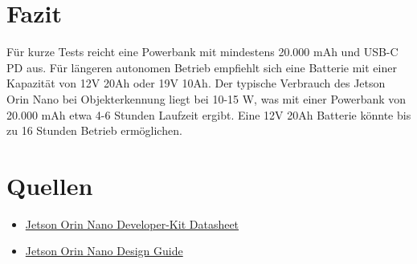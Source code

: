 \documentclass[12pt]{article}
\begin{document}
\section{Fazit}
Für kurze Tests reicht eine Powerbank mit mindestens 20.000 mAh und USB-C PD aus. Für längeren autonomen Betrieb empfiehlt sich eine Batterie mit einer Kapazität von 12V 20Ah oder 19V 10Ah. Der typische Verbrauch des Jetson Orin Nano bei Objekterkennung liegt bei 10-15 W, was mit einer Powerbank von 20.000 mAh etwa 4-6 Stunden Laufzeit ergibt. Eine 12V 20Ah Batterie könnte bis zu 16 Stunden Betrieb ermöglichen.

\section{Quellen}
\begin{itemize}
    \item \textcolor{blue}{\href{https://developer.download.nvidia.com/assets/embedded/secure/jetson/orin_nano/docs/Jetson-Orin-Nano-DevKit-Carrier-Board-Specification_SP-11324-001_v1.2.pdf?KmgI9RJCufnwzXmxbGPExVQp1r131wrAPSzR9RMDhh83EhjqXKmYVbjwEjUNXPMiO3peL2R_7D_xp9mFQTBkPF-Bon3l72rEZPIiNTVUv5oIjQsvFsQ0pqAZxr16W-12GNU3N596RY1rC1tgxd5_XwyvJRNhcRcOank-v-QwQweH0clhI5Vvdy5dZVF-qYLeuslCScepJxD-v-TAHS2XuNFpJb69-WoTOPi_AyxiG2scwgKnqQ==&t=eyJscyI6IndlYnNpdGUiLCJsc2QiOiJkZXZlbG9wZXIubnZpZGlhLmNvbS9lbWJlZGRlZC9kb3dubG9hZHMjP3NlYXJjaD1EYXRhJTIwU2hlZXRcdTAwMjZ0eD0kcHJvZHVjdCxqZXRzb25fYWd4X29yaW4samV0c29uX29yaW5fbngsamV0c29uX29yaW5fbmFubyJ9}{Jetson Orin Nano Developer-Kit Datasheet}}
    \item \textcolor{blue}{\href{https://developer.download.nvidia.com/assets/embedded/secure/jetson/orin_nx/docs/Jetson_Orin_NX_Series_and_Orin_Nano_Series_Design_Guide_DG-10931-001_v0.99.pdf?-ui8gdVNlYdmaR5WwGz-6xSE6JTrbPKmmiEaqjr9WzfO6o67G4dBKQu1cLXoFzsc2V3V4YrEuGoG5PmGBTp4DMwUibOm-PJI1TdO2lRc9sRcgO2NXf9KLdLphKAuH52nKmnexBGeYp2NIY0mCgF5LX7VctB_s_CeaxlaY_7BUog4ox6tD_iH2ZcG210QVnzdAVQuxdxAKdzFfO5YgnjsWnhPKu6q1_8wzr7B6rrkjGc2l6kfw5vPjg==&t=eyJscyI6IndlYnNpdGUiLCJsc2QiOiJkZXZlbG9wZXIubnZpZGlhLmNvbS9lbWJlZGRlZC9kb3dubG9hZHMjP3NlYXJjaD1EYXRhJTIwU2hlZXRcdTAwMjZ0eD0kcHJvZHVjdCxqZXRzb25fYWd4X29yaW4samV0c29uX29yaW5fbngsamV0c29uX29yaW5fbmFubyJ9}{Jetson Orin Nano Design Guide}}
\end{itemize}
\end{document}
